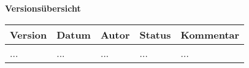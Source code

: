 

{\textbf{Versionsübersicht}}\\[2ex] 	

\begin{longtable}{|m{1.78cm}|m{1.59cm}|m{2.86cm}|m{1.9cm}|m{5.25cm}|}

	\hline																							%
	
	\textbf{Version}	&		\textbf{Datum}	&		\textbf{Autor}	&		\textbf{Status}	&		\textbf{Kommentar}	\\	%
	\hline																							%
	
	...		&		...		&		...		&		...		&		...\\				%
	\hline																							%
	
\end{longtable}

